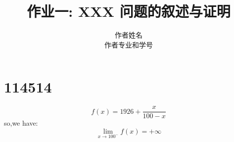 \documentclass{ctexart}
\title{作业一: XXX 问题的叙述与证明}
\author{作者姓名 \\ 作者专业和学号}
\begin{document}
\maketitle

\section{114514}

\begin{equation}
	f(x)=1926+\frac{x}{100-x}
\end{equation}
so,we have:
\begin{equation}
	\lim_{x\rightarrow 100^-}f(x)=+\infty
\end{equation}
\end{document}
